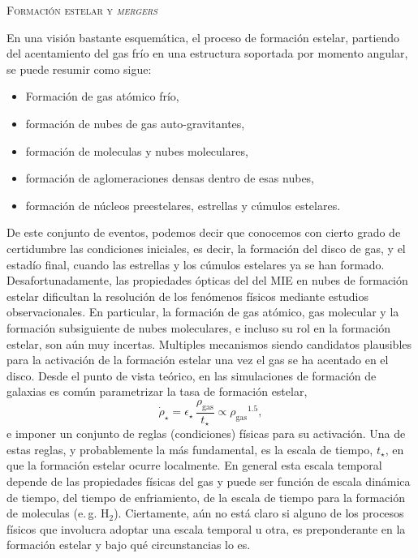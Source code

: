 \documentclass[xcolor=dvipsnames,4pt,hyperref={colorlinks,citecolor=black,linkcolor=black,urlcolor=black}]{beamer}
\begin{document}
\begin{frame}[allowframebreaks]{\textsc{Formación estelar y \emph{mergers}}}
\begin{description}
En una visión bastante esquemática, el proceso de formación estelar, partiendo del acentamiento del
gas frío en una estructura soportada por momento angular, se puede resumir como sigue:
%
\begin{itemize}
\item Formación de gas atómico frío,
\item formación de nubes de gas auto-gravitantes,
\item formación de moleculas y nubes moleculares,
\item formación de aglomeraciones densas dentro de esas nubes,
\item formación de núcleos preestelares, estrellas y cúmulos estelares.
\end{itemize}
%
De este conjunto de eventos, podemos decir que conocemos con cierto grado de certidumbre las
condiciones iniciales, es decir, la formación del disco de gas, y el estadío final, cuando las
estrellas y los cúmulos estelares ya se han formado. Desafortunadamente, las propiedades ópticas del
del MIE en nubes de formación estelar dificultan la resolución de los fenómenos físicos mediante
estudios observacionales. En particular, la formación de gas atómico, gas molecular y la formación
subsiguiente de nubes moleculares, e incluso su rol en la formación estelar, son aún muy incertas.
Multiples mecanismos siendo candidatos plausibles para la activación de la formación estelar una vez
el gas se ha acentado en el disco. Desde el punto de vista teórico, en las simulaciones de formación
de galaxias es común parametrizar la tasa de formación estelar,
%
$$
\dot{\rho}_\star = \epsilon_\star\,\frac{\rho_\text{gas}}{t_\star}\propto{\rho_\text{gas}}^{1.5},
$$
%
e imponer un conjunto de reglas (condiciones) físicas para su activación. Una de estas reglas,
y probablemente la más fundamental, es la escala de tiempo, $t_\star$, en que la formación estelar
ocurre localmente. En general esta escala temporal depende de las propiedades físicas del gas y
puede ser función de escala dinámica de tiempo, del tiempo de enfriamiento, de la escala de tiempo
para la formación de moleculas (e.\,g. H$_2$). Ciertamente, aún no está claro si alguno de los
procesos físicos que involucra adoptar una escala temporal u otra, es preponderante en la formación
estelar y bajo qué circunstancias lo es.


\end{description}
\end{frame}
\end{document}
